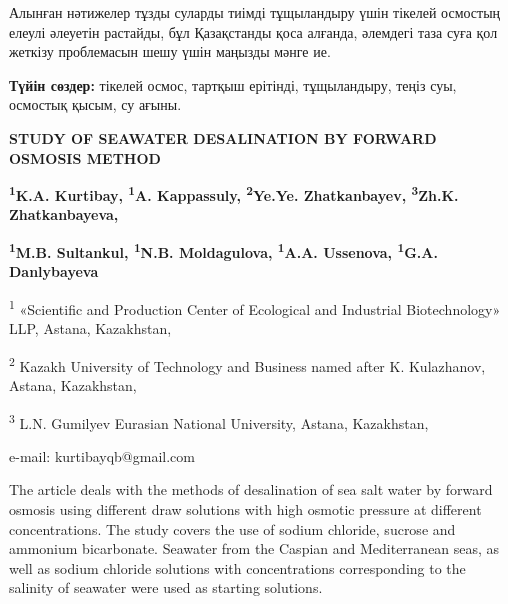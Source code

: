 Алынған нәтижелер тұзды суларды тиімді тұщыландыру үшін тікелей осмостың
елеулі әлеуетін растайды, бұл Қазақстанды қоса алғанда, әлемдегі таза
суға қол жеткізу проблемасын шешу үшін маңызды мәнге ие.

{\bfseries Түйін сөздер:} тікелей осмос, тартқыш ерітінді, тұщыландыру,
теңіз суы, осмостық қысым, су ағыны.

{\bfseries STUDY OF SEAWATER DESALINATION BY FORWARD OSMOSIS METHOD}

{\bfseries \textsuperscript{1}K.A. Kurtibay\textsuperscript{\envelope },
\textsuperscript{1}A. Kappassuly, \textsuperscript{2}Ye.Ye.
Zhatkanbayev, \textsuperscript{3}Zh.K. Zhatkanbayeva,}

{\bfseries \textsuperscript{1}M.B. Sultankul, \textsuperscript{1}N.B.
Moldagulova, \textsuperscript{1}A.A. Ussenova, \textsuperscript{1}G.A.
Danlybayeva}

\textsuperscript{1} «Scientific and Production Center of Ecological and
Industrial Biotechnology» LLP, Astana, Kazakhstan,

\textsuperscript{2} Kazakh University of Technology and Business named
after K. Kulazhanov, Astana, Kazakhstan,

\textsuperscript{3} L.N. Gumilyev Eurasian National University, Astana,
Kazakhstan,

e-mail: kurtibayqb@gmail.com

The article deals with the methods of desalination of sea salt water by
forward osmosis using different draw solutions with high osmotic
pressure at different concentrations. The study covers the use of sodium
chloride, sucrose and ammonium bicarbonate. Seawater from the Caspian
and Mediterranean seas, as well as sodium chloride solutions with
concentrations corresponding to the salinity of seawater were used as
starting solutions.

